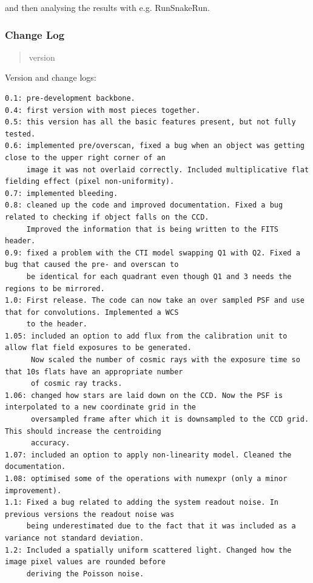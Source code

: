 \documentclass[a4paper,12pt,english]{sphinxmanual}
\begin{document}
and then analysing the results with e.g. RunSnakeRun.


\subsubsection{Change Log}
\label{simulator:change-log}\begin{quote}\begin{description}
\item[{version}] 

\end{description}\end{quote}

Version and change logs:

\begin{Verbatim}[commandchars=\\\{\}]
0.1: pre-development backbone.
0.4: first version with most pieces together.
0.5: this version has all the basic features present, but not fully tested.
0.6: implemented pre/overscan, fixed a bug when an object was getting close to the upper right corner of an
     image it was not overlaid correctly. Included multiplicative flat fielding effect (pixel non-uniformity).
0.7: implemented bleeding.
0.8: cleaned up the code and improved documentation. Fixed a bug related to checking if object falls on the CCD.
     Improved the information that is being written to the FITS header.
0.9: fixed a problem with the CTI model swapping Q1 with Q2. Fixed a bug that caused the pre- and overscan to
     be identical for each quadrant even though Q1 and 3 needs the regions to be mirrored.
1.0: First release. The code can now take an over sampled PSF and use that for convolutions. Implemented a WCS
     to the header.
1.05: included an option to add flux from the calibration unit to allow flat field exposures to be generated.
      Now scaled the number of cosmic rays with the exposure time so that 10s flats have an appropriate number
      of cosmic ray tracks.
1.06: changed how stars are laid down on the CCD. Now the PSF is interpolated to a new coordinate grid in the
      oversampled frame after which it is downsampled to the CCD grid. This should increase the centroiding
      accuracy.
1.07: included an option to apply non-linearity model. Cleaned the documentation.
1.08: optimised some of the operations with numexpr (only a minor improvement).
1.1: Fixed a bug related to adding the system readout noise. In previous versions the readout noise was
     being underestimated due to the fact that it was included as a variance not standard deviation.
1.2: Included a spatially uniform scattered light. Changed how the image pixel values are rounded before
     deriving the Poisson noise.
\end{Verbatim}
\end{document}

